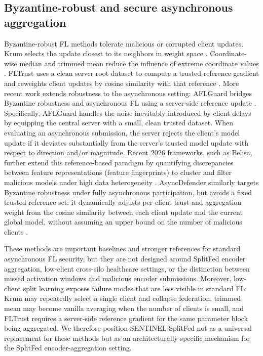 \documentclass[pdflatex,sn-mathphys-num]{sn-jnl}
\begin{document}
\subsection{Byzantine-robust and secure asynchronous aggregation}

Byzantine-robust FL methods tolerate malicious or corrupted client updates. Krum selects the update closest to its neighbors in weight space \cite{blanchard2017machine}. Coordinate-wise median and trimmed mean reduce the influence of extreme coordinate values \cite{yin2018byzantine}. FLTrust uses a clean server root dataset to compute a trusted reference gradient and reweights client updates by cosine similarity with that reference \cite{cao2021fltrust}. More recent work extends robustness to the asynchronous setting: AFLGuard bridges Byzantine robustness and asynchronous FL using a server-side reference update \cite{fang2022aflguard}. Specifically, AFLGuard handles the noise inevitably introduced by client delays by equipping the central server with a small, clean trusted dataset. When evaluating an asynchronous submission, the server rejects the client's model update if it deviates substantially from the server's trusted model update with respect to direction and/or magnitude. Recent 2026 frameworks, such as Belisa, further extend this reference-based paradigm by quantifying discrepancies between feature representations (feature fingerprints) to cluster and filter malicious models under high data heterogeneity \cite{peng2026belisa}. AsyncDefender similarly targets Byzantine robustness under fully asynchronous participation, but avoids a fixed trusted reference set: it dynamically adjusts per-client trust and aggregation weight from the cosine similarity between each client update and the current global model, without assuming an upper bound on the number of malicious clients \cite{asyncdefender2025}.

These methods are important baselines and stronger references for standard asynchronous FL security, but they are not designed around SplitFed encoder aggregation, low-client cross-silo healthcare settings, or the distinction between missed activation windows and malicious encoder submissions. Moreover, low-client split learning exposes failure modes that are less visible in standard FL: Krum may repeatedly select a single client and collapse federation, trimmed mean may become vanilla averaging when the number of clients is small, and FLTrust requires a server-side reference gradient for the same parameter block being aggregated. We therefore position SENTINEL-SplitFed not as a universal replacement for these methods but as an architecturally specific mechanism for the SplitFed encoder-aggregation setting.
\end{document}
